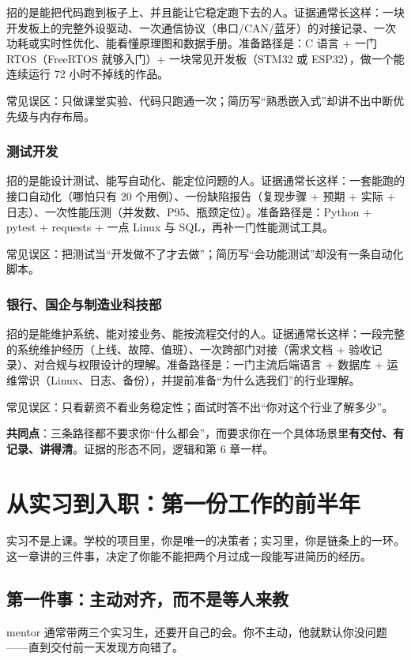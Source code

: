 \documentclass[UTF8,zihao=5,openany]{ctexbook}
\begin{document}
招的是能把代码跑到板子上、并且能让它稳定跑下去的人。证据通常长这样：一块开发板上的完整外设驱动、一次通信协议（串口/CAN/蓝牙）的对接记录、一次功耗或实时性优化、能看懂原理图和数据手册。准备路径是：C 语言 + 一门 RTOS（FreeRTOS 就够入门）+ 一块常见开发板（STM32 或 ESP32），做一个能连续运行 72 小时不掉线的作品。

常见误区：只做课堂实验、代码只跑通一次；简历写“熟悉嵌入式”却讲不出中断优先级与内存布局。

\subsection{测试开发}

招的是能设计测试、能写自动化、能定位问题的人。证据通常长这样：一套能跑的接口自动化（哪怕只有 20 个用例）、一份缺陷报告（复现步骤 + 预期 + 实际 + 日志）、一次性能压测（并发数、P95、瓶颈定位）。准备路径是：Python + pytest + requests + 一点 Linux 与 SQL，再补一门性能测试工具。

常见误区：把测试当“开发做不了才去做”；简历写“会功能测试”却没有一条自动化脚本。

\subsection{银行、国企与制造业科技部}

招的是能维护系统、能对接业务、能按流程交付的人。证据通常长这样：一段完整的系统维护经历（上线、故障、值班）、一次跨部门对接（需求文档 + 验收记录）、对合规与权限设计的理解。准备路径是：一门主流后端语言 + 数据库 + 运维常识（Linux、日志、备份），并提前准备“为什么选我们”的行业理解。

常见误区：只看薪资不看业务稳定性；面试时答不出“你对这个行业了解多少”。

\begin{keybox}
\textbf{共同点}：三条路径都不要求你“什么都会”，而要求你在一个具体场景里\textbf{有交付、有记录、讲得清}。证据的形态不同，逻辑和第 6 章一样。
\end{keybox}


\clearpage\chapter{从实习到入职：第一份工作的前半年}
实习不是上课。学校的项目里，你是唯一的决策者；实习里，你是链条上的一环。这一章讲的三件事，决定了你能不能把两个月过成一段能写进简历的经历。

\section{第一件事：主动对齐，而不是等人来教}
mentor 通常带两三个实习生，还要开自己的会。你不主动，他就默认你没问题——直到交付前一天发现方向错了。
\end{document}
